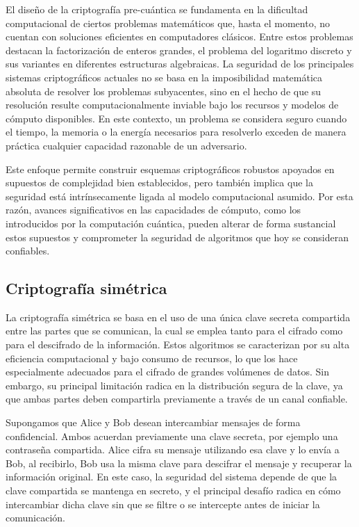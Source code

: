 El diseño de la criptografía pre-cuántica se fundamenta en la dificultad computacional de ciertos problemas matemáticos que, hasta el momento, no cuentan con soluciones eficientes en computadores clásicos. Entre estos problemas destacan la factorización de enteros grandes, el problema del logaritmo discreto y sus variantes en diferentes estructuras algebraicas. La seguridad de los principales sistemas criptográficos actuales no se basa en la imposibilidad matemática absoluta de resolver los problemas subyacentes, sino en el hecho de que su resolución resulte computacionalmente inviable bajo los recursos y modelos de cómputo disponibles. En este contexto, un problema se considera seguro cuando el tiempo, la memoria o la energía necesarios para resolverlo exceden de manera práctica cualquier capacidad razonable de un adversario.

Este enfoque permite construir esquemas criptográficos robustos apoyados en supuestos de complejidad bien establecidos, pero también implica que la seguridad está intrínsecamente ligada al modelo computacional asumido. Por esta razón, avances significativos en las capacidades de cómputo, como los introducidos por la computación cuántica, pueden alterar de forma sustancial estos supuestos y comprometer la seguridad de algoritmos que hoy se consideran confiables.

\subsection{Criptografía simétrica}
La criptografía simétrica se basa en el uso de una única clave secreta compartida entre las partes que se comunican, la cual se emplea tanto para el cifrado como para el descifrado de la información. Estos algoritmos se caracterizan por su alta eficiencia computacional y bajo consumo de recursos, lo que los hace especialmente adecuados para el cifrado de grandes volúmenes de datos. Sin embargo, su principal limitación radica en la distribución segura de la clave, ya que ambas partes deben compartirla previamente a través de un canal confiable.

Supongamos que Alice y Bob desean intercambiar mensajes de forma confidencial. Ambos acuerdan previamente una clave secreta, por ejemplo una contraseña compartida. Alice cifra su mensaje utilizando esa clave y lo envía a Bob, al recibirlo, Bob usa la misma clave para descifrar el mensaje y recuperar la información original. En este caso, la seguridad del sistema depende de que la clave compartida se mantenga en secreto, y el principal desafío radica en cómo intercambiar dicha clave sin que se filtre o se intercepte antes de iniciar la comunicación.

